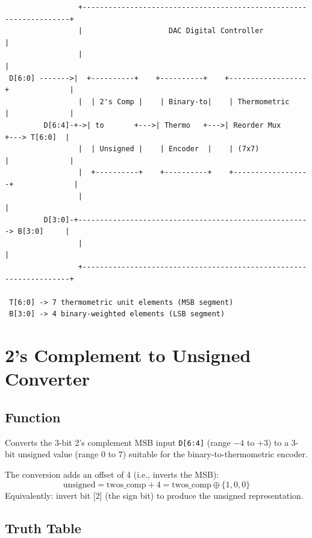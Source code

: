 \documentclass[11pt,a4paper]{article}
\begin{document}
\begin{verbatim}
                 +-------------------------------------------------------------------+
                 |                    DAC Digital Controller                          |
                 |                                                                    |
 D[6:0] ------->|  +----------+    +----------+    +------------------+              |
                 |  | 2's Comp |    | Binary-to|    | Thermometric     |              |
         D[6:4]-+->| to       +--->| Thermo   +--->| Reorder Mux      +---> T[6:0]  |
                 |  | Unsigned |    | Encoder  |    | (7x7)            |              |
                 |  +----------+    +----------+    +------------------+              |
                 |                                                                    |
         D[3:0]-+------------------------------------------------------> B[3:0]     |
                 |                                                                    |
                 +-------------------------------------------------------------------+

 T[6:0] -> 7 thermometric unit elements (MSB segment)
 B[3:0] -> 4 binary-weighted elements (LSB segment)
\end{verbatim}

\section{2's Complement to Unsigned Converter}

\subsection{Function}

Converts the 3-bit 2's complement MSB input \texttt{D[6:4]} (range $-4$ to $+3$) to a 3-bit unsigned value (range $0$ to $7$) suitable for the binary-to-thermometric encoder.

The conversion adds an offset of 4 (i.e., inverts the MSB):
\[
  \text{unsigned} = \text{twos\_comp} + 4 = \text{twos\_comp} \oplus \{1, 0, 0\}
\]
Equivalently: invert bit [2] (the sign bit) to produce the unsigned representation.

\subsection{Truth Table}
\end{document}
